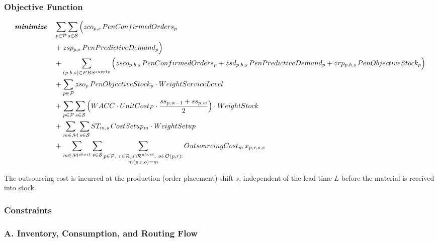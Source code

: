 \documentclass{article}
\begin{document}
\subsubsection{Objective Function}

\begin{align}
\textbf{\textit{minimize}} \quad 
&
\sum_{p \in \mathcal{P}} \sum_{s \in \mathcal{S}}
\Big(
zco_{p,s} \, PenConfirmedOrders_p
\nonumber \\
& + zsp_{p,s} \, PenPredictiveDemand_p
\Big)
\nonumber \\
&+
\sum_{(p,b,s) \in PBS^{supply}}
\Big(
zsco_{p,b,s} \, PenConfirmedOrders_p
+ zsd_{p,b,s} \, PenPredictiveDemand_p
+ zrp_{p,b,s} \, PenObjectiveStock_p
\Big)
\nonumber \\
&+
\sum_{p \in \mathcal{P}} zso_{p} \, PenObjectiveStock_p \cdot WeightServiceLevel
\nonumber \\
&+
\sum_{p \in \mathcal{P}} \sum_{s \in \mathcal{S}} \Big( WACC \cdot UnitCost_{P} \cdot \frac{ss_{p,w-1}+ss_{p,w}}{2} \Big)
\cdot WeightStock
\nonumber \\
&+
\sum_{m \in \mathcal{M}} \sum_{s \in \mathcal{S}}
ST_{m,s} \, CostSetup_m \cdot WeightSetup
\nonumber \\
&+
\sum_{m \in \mathcal{M}^{ghost}} \sum_{s \in \mathcal{S}}
\sum_{\substack{p \in \mathcal{P},\ r \in \mathcal{R}_p \cap \mathcal{R}^{ghost},\ o \in \mathcal{O}(p,r):\\ m(p,r,o)=m}}
OutsourcingCost_m \, x_{p,r,o,s}
\label{eq:objective_function}
\end{align}

The outsourcing cost is incurred at the production (order placement) shift $s$, independent of the lead time $L$ before the material is received into stock.

\subsubsection{Constraints}

\noindent\text{---------------------------------------------------------------------------------------------------------}

\subsubsection*{A. Inventory, Consumption, and Routing Flow}
\end{document}
